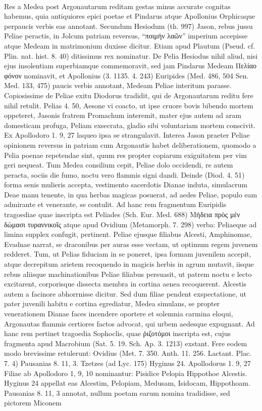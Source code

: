 \documentclass[a4paper, 11pt, oneside, polutonikogreek, german]{article}
\begin{document}
\paragraph{}
Res a Medea post Argonautarum reditam gestas minus accurate cognitas habemus, quia antiquiores epici poetae et Pindarus atque Apollonius Orphicaque perpaucis verbis eas annotant. Secundum Hesiodum (th. 997) Jason, rebus jussu Peliae peractis, in Jolcum patriam reversus, "`ποιμήν λαῶν"' imperium accepisse atque Medeam in matrimonium duxisse dicitur. Etiam apud Plautum (Pseud. cf. Plin. nat. hist. 8. 40) ditissimus rex nominatur. De Pelia Hesiodus nihil aliud, nisi ejus insolentiam superbiamque commemoravit, sed jam Pindarus Medeam Πελίαο φόνον nominavit, et Apollonius (3. 1135. 4. 243) Euripides (Med. 486, 504 Sen. Med. 133, 475) paucis verbis annotant, Medeam Peliae interitum parasse. Copiosissime de Peliae exitu Diodorus tradidit, qui de Argonautarum reditu fere nihil retulit. Pelias 4. 50, Aesone vi coacto, ut ipse cruore bovis bibendo mortem oppeteret, Jasonis fratrem Promachum interemit, mater ejus autem ad aram domesticam profuga, Peliam exsecrata, gladio sibi voluntariam mortem conscivit. Ex Apollodoro 1. 9, 27 laqueo ipsa se strangulavit. Interea Jason praeter Peliae opinionem reversus in patriam cum Argonautis habet deliberationem, quomodo a Pelia poenae repetendae sint, quum res propter copiarum exiguitatem per vim geri nequeat. Tum Medea consilium cepit, Peliae dolo occidendi, re autem peracta, sociis die fumo, noctu vero flammis signi dandi. Deinde (Diod. 4. 51) forma senis mulieris accepta, vestimento sacerdotis Dianae induta, simulacrum Deae manu tenente, in qua herbas magicas posuerat, ad aedes Peliae, populo eam admirante et venerante, se contulit. Ad hanc rem fragmentum Euripidis tragoediae quae inscripta est Peliades (Sch. Eur. Med. 688) Μήδεια πρὸς μὲν δώμασι τυραννικοῖς atque apud Ovidium (Metamorph. 7. 298) verba: Peliaeque ad limina supplex confugit, pertinent. Peliae ejusque filiabus Alcesti, Amphinomae, Evadnae narrat, se draconibus per auras esse vectam, ut optimum regem juvenem redderet. Tum, ut Pelias fiduciam in se poneret, ipsa formam juvenilem accepit, atque decrepitum arietem recoquendo in magicis herbis in agrum mutavit, iisque rebus aliisque machinationibus Peliae filiabus persuasit, ut patrem noctu e lecto excitarent, corporisque dissecta membra in cortina aenea recoquerent. Alcestis autem a facinore abhorrnisse dicitur. Sed dum filiae pendent exspectatione, ut pater juvenili habitu e cortina egrediatur, Medea simulans, se propter venerationem Dianae faces incendere oportere et solemnia carmina eloqui, Argonautas flammis certiores factos advocat, qui urbem aedesque expugnant. Ad hanc rem pertinet tragoedia Sophoclis, quae ῥιζοτόμοι inscripta est, cujus fragmenta apud Macrobium (Sat. 5. 19. Sch. Ap. 3. 1213) exstant. Fere eodem modo brevissime retulerunt: Ovidius (Met. 7. 350. Anth. 11. 256. Lactant. Plac. 7. 4) Pausanias 8. 11, 3. Tzetzes (ad Lyc. 175) Hyginus 24. Apollodorus 1. 9, 27 Filiae ab Apollodoro 1, 9, 10 nominantur: Pisidice Pelopia Hippothoe Alcestis. Hyginus 24 appellat eas Alcestim, Pelopiam, Medusam, Isidocam, Hippothoam. Pausanias 8. 11, 3 annotat, nullum poetam earum nomina tradidisse, sed pictorem Miconem 
\end{document}
